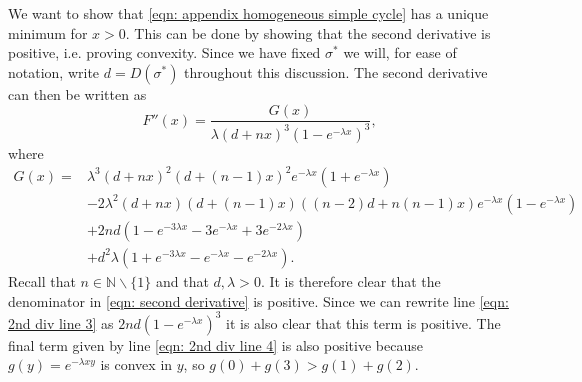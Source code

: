\documentclass[11pt,a4paper]{article}
\begin{document}
We want to show that \eqref{eqn: appendix homogeneous simple cycle} has a unique minimum for $x > 0$.
This can be done by showing that the second derivative is positive, i.e. proving convexity.
Since we have fixed $\sigma^*$ we will, for ease of notation, write $d = D(\sigma^*)$ throughout this discussion.
The second derivative can then be written as 
\begin{equation} \label{eqn: second derivative}
    F''(x) = 
    \frac{G(x)}{\lambda (d + nx)^3 (1-e^{-\lambda x})^3},
\end{equation}
where
\begin{align}
    G(x) = 
    & \lambda^3(d+nx)^2(d+(n-1)x)^2 e^{-\lambda x}(1+e^{-\lambda x})  \label{eqn: 2nd div line 1} \\
    & -2\lambda^2(d+nx)(d+(n-1)x)((n-2)d+n(n-1)x)e^{-\lambda x}(1-e^{-\lambda x})  \label{eqn: 2nd div line 2}\\
    & + 2nd(1-e^{-3\lambda x}-3e^{-\lambda x}+3e^{-2\lambda x})  \label{eqn: 2nd div line 3}\\
    & + d^2 \lambda (1+e^{-3\lambda x}-e^{-\lambda x}-e^{-2\lambda x}). \label{eqn: 2nd div line 4}
\end{align}
Recall that $n \in \mathbb{N} \backslash \{ 1\}$ and that $d, \lambda > 0$.
It is therefore clear that the denominator in \eqref{eqn: second derivative} is positive.
Since we can rewrite line \eqref{eqn: 2nd div line 3} as $2nd(1-e^{-\lambda x})^3$ it is also clear that this term is positive.
The final term given by line \eqref{eqn: 2nd div line 4} is also positive because $g(y) = e^{-\lambda x y}$ is convex in $y$, so $g(0) + g(3) > g(1) + g(2)$.
\end{document}
